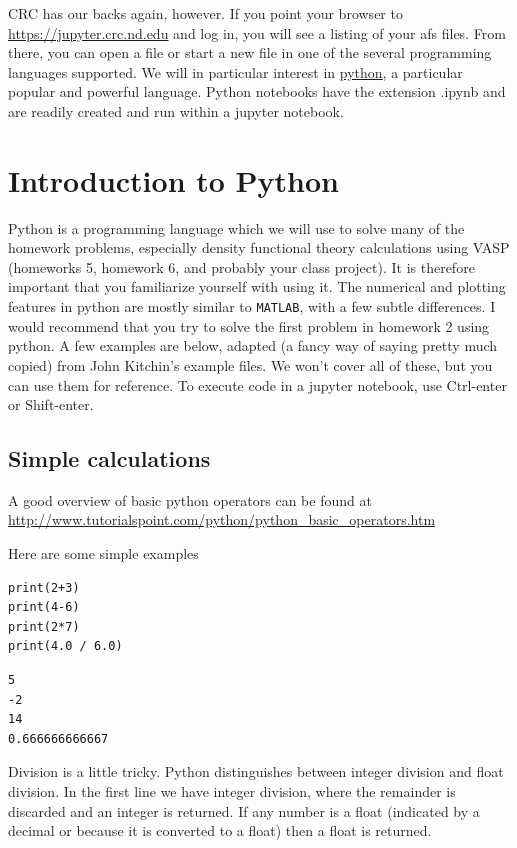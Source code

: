\documentclass[11pt]{article}
\begin{document}
CRC has our backs again, however.  If you point your browser to \url{https://jupyter.crc.nd.edu}
and log in, you will see a listing of your afs files.  From there, you can open a file or
start a new file in one of the several programming languages supported.  We will in
particular interest in \href{https://python.org}{python}, a particular popular and powerful language.  Python
notebooks have the extension .ipynb and are readily created and run within a jupyter notebook.

\section{Introduction to Python}
\label{sec:orgc721520}
Python is a programming language which we will use to solve many of the homework problems,
especially density functional theory calculations using VASP (homeworks 5, homework 6, and
probably your class project). It is therefore important that you familiarize yourself with
using it. The numerical and plotting features in python are mostly similar to \texttt{MATLAB},
with a few subtle differences. I would recommend that you try to solve the first problem
in homework 2 using python. A few examples are below, adapted (a fancy way of saying
pretty much copied) from John Kitchin's example files. We won't cover all of these, but
you can use them for reference. To execute code in a jupyter notebook, use Ctrl-enter or Shift-enter.

\subsection{Simple calculations}
\label{sec:org10ca1f8}

A good overview of basic python operators can be found at \url{http://www.tutorialspoint.com/python/python\_basic\_operators.htm}

Here are some simple examples
\begin{verbatim}
print(2+3)
print(4-6)
print(2*7)
print(4.0 / 6.0)
\end{verbatim}

\begin{verbatim}
5
-2
14
0.666666666667
\end{verbatim}


Division is a little tricky. Python distinguishes between integer division and float division. In the first line we have integer division, where the remainder is discarded and an integer is returned. If any number is a float (indicated by a decimal or because it is converted to a float) then a float is returned.
\end{document}
